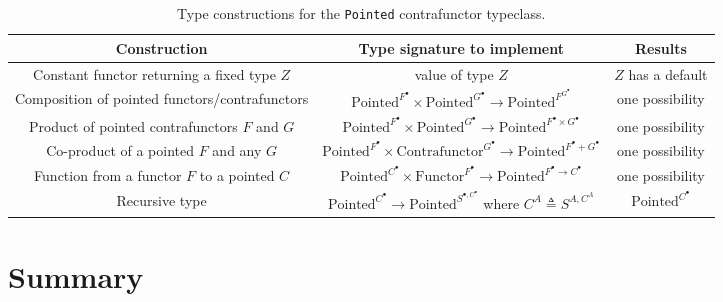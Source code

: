 \begin{table}
\begin{centering}
\begin{tabular}{|c|c|c|}
\hline 
\textbf{\footnotesize{}Construction} & \textbf{\footnotesize{}Type signature to implement} & \textbf{\footnotesize{}Results}\tabularnewline
\hline 
\hline 
{\footnotesize{}Constant functor returning a fixed type $Z$} & {\footnotesize{}value of type $Z$} & {\footnotesize{}$Z$ has a default}\tabularnewline
\hline 
{\footnotesize{}Composition of pointed functors/contrafunctors} & {\footnotesize{}$\text{Pointed}^{F^{\bullet}}\times\text{Pointed}^{G^{\bullet}}\rightarrow\text{Pointed}^{F^{G^{\bullet}}}$} & {\footnotesize{}one possibility}\tabularnewline
\hline 
{\footnotesize{}Product of pointed contrafunctors $F$ and $G$} & {\footnotesize{}$\text{Pointed}^{F^{\bullet}}\times\text{Pointed}^{G^{\bullet}}\rightarrow\text{Pointed}^{F^{\bullet}\times G^{\bullet}}$} & {\footnotesize{}one possibility}\tabularnewline
\hline 
{\footnotesize{}Co-product of a pointed $F$ and any $G$} & {\footnotesize{}$\text{Pointed}^{F^{\bullet}}\times\text{Contrafunctor}^{G^{\bullet}}\rightarrow\text{Pointed}^{F^{\bullet}+G^{\bullet}}$} & {\footnotesize{}one possibility}\tabularnewline
\hline 
{\footnotesize{}Function from a functor $F$ to a pointed $C$} & {\footnotesize{}$\text{Pointed}^{C^{\bullet}}\times\text{Functor}^{F^{\bullet}}\rightarrow\text{Pointed}^{F^{\bullet}\rightarrow C^{\bullet}}$} & {\footnotesize{}one possibility}\tabularnewline
\hline 
{\footnotesize{}Recursive type} & {\footnotesize{}$\text{Pointed}^{C^{\bullet}}\rightarrow\text{Pointed}^{S^{\bullet,C^{\bullet}}}$
where $C^{A}\triangleq S^{A,C^{A}}$} & {\footnotesize{}$\text{Pointed}^{C^{\bullet}}$}\tabularnewline
\hline 
\end{tabular}
\par\end{centering}
\caption{Type constructions for the \lstinline!Pointed! contrafunctor typeclass.\label{tab:Type-constructions-for-pointed-contrafunctor}}
\end{table}


\section{Summary}

